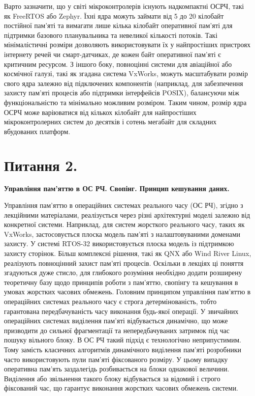 \documentclass[14pt, a4paper]{extreport}
\begin{document}
	Варто зазначити, що у світі мікроконтролерів існують надкомпактні ОСРЧ, такі як FreeRTOS або Zephyr. Їхні ядра можуть займати від 5 до 20 кілобайт постійної пам'яті та вимагати лише кілька кілобайт оперативної пам'яті для підтримки базового планувальника та невеликої кількості потоків. Такі мінімалістичні розміри дозволяють використовувати їх у найпростіших пристроях інтернету речей чи смарт-датчиках, де кожен байт оперативної пам'яті є критичним ресурсом. З іншого боку, повноцінні системи для авіаційної або космічної галузі, такі як згадана система VxWorks, можуть масштабувати розмір свого ядра залежно від підключених компонентів (наприклад, для забезпечення захисту пам'яті процесів або підтримки інтерфейсів POSIX), балансуючи між функціональністю та мінімально можливим розміром. Таким чином, розмір ядра ОСРЧ може варіюватися від кількох кілобайт для найпростіших мікроконтролерних систем до десятків і сотень мегабайт для складних вбудованих платформ. 
	
	\pagebreak
	
	\section*{Питання 2.}
	
	\textbf{Управління пам'яттю в ОС РЧ. Свопінг. Принцип кешування даних.} 
	
	Управління пам'яттю в операційних системах реального часу (ОС РЧ), згідно з лекційними матеріалами, реалізується через різні архітектурні моделі залежно від конкретної системи. Наприклад, для систем жорсткого реального часу, таких як VxWorks, застосовується плоска модель пам'яті з налаштовуваними доменами захисту. У системі RTOS-32 використовується плоска модель із підтримкою захисту сторінок. Більш комплексні рішення, такі як QNX або Wind River Linux, реалізують повноцінний захист пам'яті процесів. Оскільки в лекціях ці поняття згадуються дуже стисло, для глибокого розуміння необхідно додати розширену теоретичну базу щодо принципів роботи з пам'яттю, свопінгу та кешування в умовах жорстких часових обмежень.  Головним принципом управління пам'яттю в операційних системах реального часу є строга детермінованість, тобто гарантована передбачуваність часу виконання будь-якої операції. У звичайних операційних системах виділення пам'яті відбувається динамічно, що може призводити до сильної фрагментації та непередбачуваних затримок під час пошуку вільного блоку. В ОС РЧ такий підхід є технологічно неприпустимим. Тому замість класичних алгоритмів динамічного виділення пам'яті розробники часто використовують пули пам'яті фіксованого розміру. У цьому випадку оперативна пам'ять заздалегідь розбивається на блоки однакової величини. Виділення або звільнення такого блоку відбувається за відомий і строго фіксований час, що гарантує виконання жорстких часових обмежень системи. 
	
\end{document}
